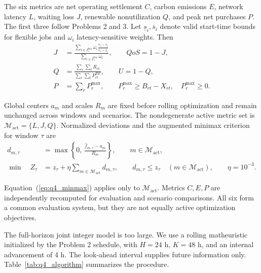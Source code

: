 The six metrics are net operating settlement $C$, carbon emissions $E$, network latency $L$, waiting loss $J$, renewable nonutilization $Q$, and peak net purchases $P$. The first three follow Problems 2 and 3. Let $\underline{s}_i,\overline{s}_i$ denote valid start-time bounds for flexible jobs and $\omega_i$ latency-sensitive weights. Then
\begin{equation}
	\begin{aligned}
		J&=
		\frac{
			\displaystyle\sum_{i\in I^{\mathrm{flex}}_+}
			\omega_i
			\frac{s_i-\underline{s}_i}
			{\overline{s}_i-\underline{s}_i}}
		{\displaystyle\sum_{i\in I^{\mathrm{flex}}_+}\omega_i},
		\qquad QoS=1-J,\\
		Q&=
		\frac{\displaystyle\sum_r\sum_tR_{rt}}
		{\displaystyle\sum_r\sum_tP^{RE}_{rt}},
		\qquad U=1-Q,\\
		P&=\sum_rP_r^{\max},
		\qquad
		P_r^{\max}\geq B_{rt}-X_{rt},
		\quad P_r^{\max}\geq0.
	\end{aligned}
	\label{eq:q4_metrics}
\end{equation}

Global centers $a_m$ and scales $R_m$ are fixed before rolling optimization and remain unchanged across windows and scenarios. The nondegenerate active metric set is $\mathcal M_{\mathrm{act}}=\{L,J,Q\}$.
Normalized deviations and the augmented minimax criterion for window $\tau$ are
\begin{equation}
	\begin{aligned}
		d_{m,\tau}
		&=
		\max\left\{
		0,\,
		\frac{\hat f_{m,\tau}-a_m}{R_m}
		\right\},
		\qquad m\in\mathcal M_{\mathrm{act}},\\
		\min\quad Z_\tau
		&=
		z_\tau+\eta\sum_{m\in\mathcal M_{\mathrm{act}}} d_{m,\tau},
		\qquad
		d_{m,\tau}\leq z_\tau\quad(m\in\mathcal M_{\mathrm{act}}),
		\qquad
		\eta=10^{-3}.
	\end{aligned}
	\label{eq:q4_minmax}
\end{equation}

Equation~(\ref{eq:q4_minmax}) applies only to $\mathcal M_{\mathrm{act}}$. Metrics $C,E,P$ are independently recomputed for evaluation and scenario comparisons. All six form a common evaluation system, but they are not equally active optimization objectives.

The full-horizon joint integer model is too large. We use a rolling matheuristic initialized by the Problem 2 schedule, with $H=24$ h, $K=48$ h, and an internal advancement of 4 h. The look-ahead interval supplies future information only. Table~\ref{tab:q4_algorithm} summarizes the procedure.

